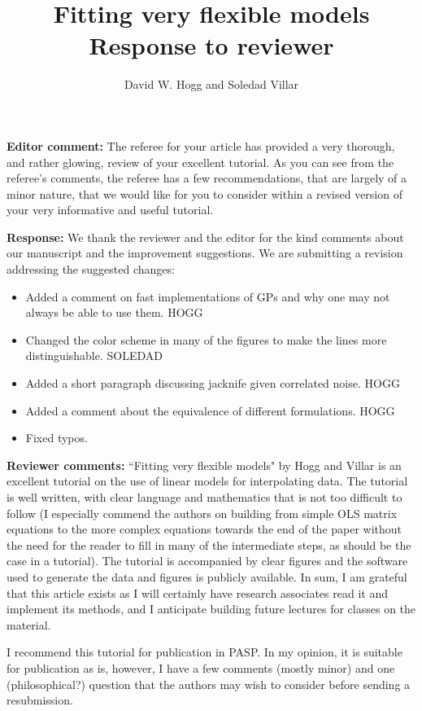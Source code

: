 \documentclass{amsart}
\title{Fitting very flexible models \\
Response to reviewer}
\author{David W. Hogg and Soledad Villar}
\begin{document}
\maketitle

\textbf{Editor comment:} The referee for your article has provided a very thorough, and rather glowing, review of your excellent tutorial.  As you can see from the referee's comments, the referee has a few recommendations, that are largely of a minor nature, that we would like for you to consider within a revised version of your very informative and useful tutorial.

\textbf{Response:} We thank the reviewer and the editor for the kind comments about our manuscript and the improvement suggestions. We are submitting a revision addressing the suggested changes:
\begin{itemize}
    \item Added a comment on fast implementations of GPs and why one may not always be able to use them. HOGG
    \item Changed the color scheme in many of the figures to make the lines more distinguishable. SOLEDAD
    \item Added a short paragraph discussing jacknife given correlated noise. HOGG
    \item Added a comment about the equivalence of different formulations. HOGG
    \item Fixed typos.
\end{itemize}

\textbf{Reviewer comments:}
``Fitting very flexible models" by Hogg and Villar is an excellent tutorial on the use of linear models for interpolating data. The tutorial is well written, with clear language and mathematics that is not too difficult to follow (I especially commend the authors on building from simple OLS matrix equations to the more complex equations towards the end of the paper without the need for the reader to fill in many of the intermediate steps, as should be the case in a tutorial). The tutorial is accompanied by clear figures and the software used to generate the data and figures is publicly available. In sum, I am grateful that this article exists as I will certainly have research associates read it and implement its methods, and I anticipate building future lectures for classes on the material.

I recommend this tutorial for publication in PASP. In my opinion, it is suitable for publication as is, however, I have a few comments (mostly minor) and one (philosophical?) question that the authors may wish to consider before sending a resubmission.
\end{document}
